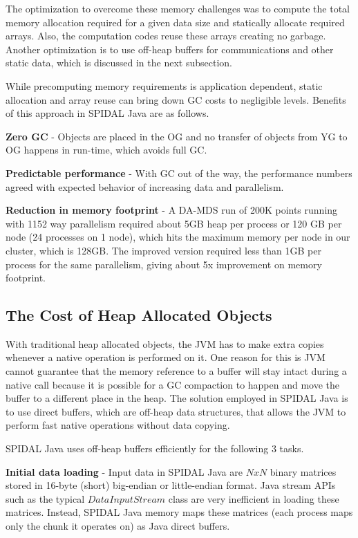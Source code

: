 The optimization to overcome these memory challenges was to compute the total memory allocation required for a given data size and statically allocate required arrays. Also, the computation codes reuse these arrays creating no garbage. Another optimization is to use off-heap buffers for communications and other static data, which is discussed in the next subsection.

While precomputing memory requirements is application dependent, static allocation and array reuse can bring down GC costs to negligible levels. Benefits of this approach in SPIDAL Java are as follows.

\textbf{Zero GC} - Objects are placed in the OG and no transfer of objects from YG to OG happens in run-time, which avoids full GC.

\textbf{Predictable performance} - With GC out of the way, the performance numbers agreed with expected behavior of increasing data and parallelism.

\textbf{Reduction in memory footprint} - A DA-MDS run of 200K points running with 1152 way parallelism required about 5GB heap per process or 120 GB per node (24 processes on 1 node), which hits the maximum memory per node in our cluster, which is 128GB. The improved version required less than 1GB per process for the same parallelism, giving about 5x improvement on memory footprint. 

\subsection{The Cost of Heap Allocated Objects}
With traditional heap allocated objects, the JVM has to make extra copies whenever a native operation is performed on it. One reason for this is  JVM cannot guarantee that the memory reference to a buffer will stay intact during a native call because it is possible for a GC compaction to happen and move the buffer to a different place in the heap. The solution employed in SPIDAL Java is to use direct buffers, which are off-heap data structures, that allows the JVM to perform fast native operations without data copying. 

SPIDAL Java uses off-heap buffers efficiently for the following 3 tasks.

\textbf{Initial data loading} - Input data in SPIDAL Java are $NxN$ binary matrices stored in 16-byte (short) big-endian or little-endian format. Java stream APIs such as the typical $DataInputStream$ class are very inefficient in loading these matrices. Instead, SPIDAL Java memory maps these matrices (each process maps only the chunk it operates on) as Java direct buffers.

